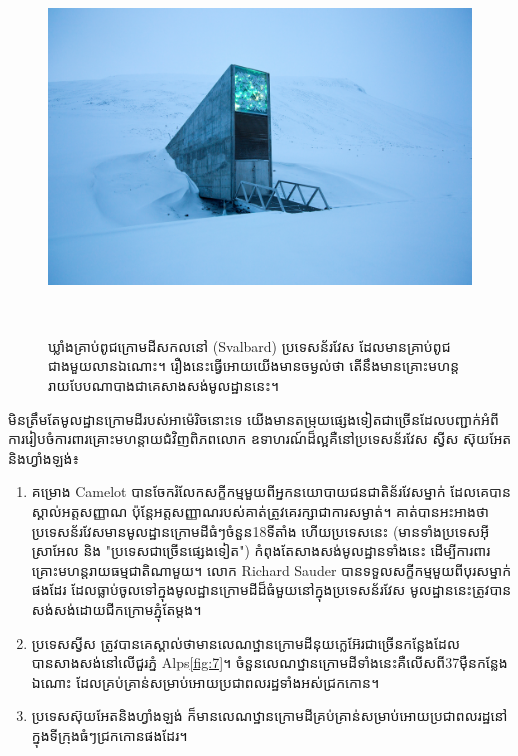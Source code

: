 \documentclass[10pt,twocolumn,letterpaper]{article}
\begin{document}
\begin{figure}[t]
\begin{center}
   \includegraphics[width=1\linewidth]{svalbard.jpg}
\end{center}
   \caption{ឃ្លាំងគ្រាប់ពូជក្រោមដីសកលនៅ (Svalbard) ប្រទេសន័រវែស ដែលមានគ្រាប់ពូជជាងមួយលានឯណោះ\cite{24}។ រឿងនេះធ្វើអោយយើងមានចម្ងល់ថា តើនឹងមានគ្រោះមហន្តរាយបែបណាបាងជាគេសាងសង់មូលដ្ឋាននេះ។}​
\label{fig:8}
\label{fig:onecol}
\end{figure}

	មិនត្រឹមតែមូលដ្ឋានក្រោមដីរបស់អាម៉េរិចនោះទេ យើងមានតម្រុយផ្សេងទៀតជាច្រើនដែលបញ្ជាក់អំពីការរៀបចំការពារគ្រោះមហន្តាយជំវិញពិភពលោក ឧទាហរណ៍​ដ៏ល្អគឺនៅប្រទេសន័រវែស ស្វីស ស៊ុយអែត និងហ្វាំងឡង់៖

\begin{flushleft}
\begin{enumerate}
    \item គម្រោង Camelot បានចែករំលែកសក្ខីកម្មមួយពីអ្នកនយោបាយជនជាតិន័រវែសម្នាក់\cite{25,26} ដែលគេបានស្គាល់អត្តសញ្ញាណ ប៉ុន្តែអត្តសញ្ញាណរបស់គាត់ត្រូវគេរក្សាជាការសម្ងាត់។ គាត់បានអះអាងថាប្រទេសន័រវែសមានមូលដ្ឋានក្រោមដីធំៗចំនួន18ទីតាំង ហើយប្រទេសនេះ (មានទាំងប្រទេសអុីស្រាអែល និង "ប្រទេសជាច្រើនផ្សេងទៀត") កំពុងតែសាងសង់មូលដ្ឋានទាំងនេះ ដើម្បីការពារគ្រោះមហន្តរាយធម្មជាតិណាមួយ។ លោក Richard Sauder បានទទួលសក្ខីកម្មមួយពីបុរសម្នាក់ផងដែរ ដែលធ្លាប់ចូលទៅក្នុងមូលដ្ឋានក្រោមដីដ៏ធំមួយនៅក្នុងប្រទេសន័រវែស មូលដ្ឋាននេះត្រូវបានសង់សង់ដោយជីកក្រោមភ្នុំតែម្តង\cite{22}។ 
    \item ប្រទេសស្វីស ត្រូវបានគេស្គាល់ថាមានលេណឋ្ឋានក្រោមដីនុយក្លេអ៊ែរជាច្រើនកន្លែងដែលបានសាងសង់នៅលើជួរភ្នំ Alps\ref{fig:7}។ ចំនួនលេណឋ្ឋានក្រោមដីទាំងនេះគឺលើសពី37មុឺនកន្លែងឯណោះ ដែលគ្រប់គ្រាន់សម្រាប់អោយប្រជាពលរដ្ឋទាំងអស់ជ្រកកោន\cite{27}។
    \item ប្រទេសស៊ុយអែតនិងហ្វាំងឡង់ ក៏មានលេណឋ្ឋានក្រោមដីគ្រប់គ្រាន់សម្រាប់អោយប្រជាពលរដ្ឋនៅក្នុងទីក្រុងធំៗជ្រកកោនផងដែរ\cite{27}។
\end{enumerate}
\end{flushleft}
\end{document}
